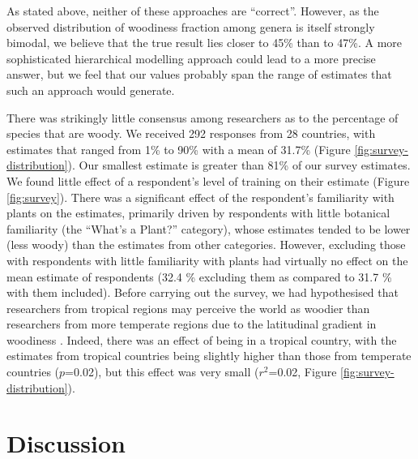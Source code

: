 \documentclass[a4paper,12pt]{article}
\begin{document}
%
As stated above, neither of these approaches are ``correct''. However,
as the observed distribution of woodiness fraction among genera
is itself strongly bimodal, we believe that the true result lies
closer to 45\% than to 47\%.  A more sophisticated hierarchical
modelling approach could lead to a more precise answer, but we feel
that our values probably span the range of estimates that such an
approach would generate.

There was strikingly little consensus among researchers as to the
percentage of species that are woody.  We received 292 responses from
28 countries, with estimates that ranged from 1\% to 90\% with a mean
of 31.7\% (Figure \ref{fig:survey-distribution}).  Our smallest
estimate is greater than 81\% of our survey estimates.
%
%
We found little effect of a respondent's level of training on their
estimate (Figure \ref{fig:survey}).  There was a significant effect of
the respondent's familiarity with plants on the estimates, primarily
driven by respondents with little botanical familiarity (the ``What's
a Plant?'' category), whose estimates tended to be lower (less woody)
than the estimates from other categories. However, excluding those with
respondents with little familiarity with plants had virtually no effect
on the mean estimate of respondents (32.4 \% excluding them as compared
to 31.7 \% with them included).
%
Before carrying out the survey, we had hypothesised that researchers
from tropical regions may perceive the world as woodier than
researchers from more temperate regions due to the latitudinal
gradient in woodiness \citep{Molesheihgt}.
%
Indeed, there was an effect of being in a tropical country, with the
estimates from tropical countries being slightly higher than those
from temperate countries ($p$=0.02), but this effect was very small
($r^2$=0.02, Figure \ref{fig:survey-distribution}).




\section{Discussion}
\end{document}
